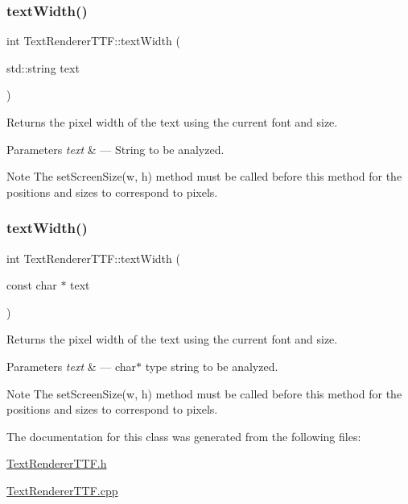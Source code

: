 \subsubsection{\texorpdfstring{text\+Width()}{textWidth()}\hspace{0.1cm}{\footnotesize\ttfamily [1/2]}}
{\footnotesize\ttfamily int Text\+Renderer\+T\+T\+F\+::text\+Width (\begin{DoxyParamCaption}\item[{std\+::string}]{text }\end{DoxyParamCaption})}



Returns the pixel width of the text using the current font and size. 


\begin{DoxyParams}{Parameters}
{\em text} & --- String to be analyzed.\\
\hline
\end{DoxyParams}
\begin{DoxyNote}{Note}
The set\+Screen\+Size(w, h) method must be called before this method for the positions and sizes to correspond to pixels. 
\end{DoxyNote}
\mbox{\label{class_text_renderer_t_t_f_a64698c7661b1e10f08e41fcf8ae9d8f5}} 
\subsubsection{\texorpdfstring{text\+Width()}{textWidth()}\hspace{0.1cm}{\footnotesize\ttfamily [2/2]}}
{\footnotesize\ttfamily int Text\+Renderer\+T\+T\+F\+::text\+Width (\begin{DoxyParamCaption}\item[{const char $\ast$}]{text }\end{DoxyParamCaption})}



Returns the pixel width of the text using the current font and size. 


\begin{DoxyParams}{Parameters}
{\em text} & --- char$\ast$ type string to be analyzed.\\
\hline
\end{DoxyParams}
\begin{DoxyNote}{Note}
The set\+Screen\+Size(w, h) method must be called before this method for the positions and sizes to correspond to pixels. 
\end{DoxyNote}


The documentation for this class was generated from the following files\+:\begin{DoxyCompactItemize}
\item 
\hyperlink{_text_renderer_t_t_f_8h}{Text\+Renderer\+T\+T\+F.\+h}\item 
\hyperlink{_text_renderer_t_t_f_8cpp}{Text\+Renderer\+T\+T\+F.\+cpp}\end{DoxyCompactItemize}
